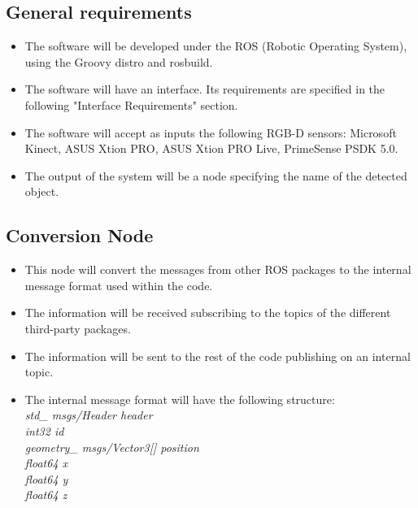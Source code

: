 \documentclass{article}
\begin{document}
\subsection{General requirements}
\begin{itemize}

\item The software will be developed under the ROS (Robotic Operating System), using the Groovy distro and rosbuild.
\item The software will have an interface. Its requirements are specified in the following "Interface Requirements" section. 
\item The software will accept as inputs the following RGB-D sensors: Microsoft Kinect, ASUS Xtion PRO, ASUS Xtion PRO Live, PrimeSense PSDK 5.0.
\item The output of the system will be a node specifying the name of the detected object. 
 
\end{itemize}
 
\subsection{Conversion Node}
\begin{itemize}
\item This node will convert the messages from other ROS packages to the internal message format used within the code. 
\item The information will be received subscribing to the topics of the different third-party packages. 
\item The information will be sent to the rest of the code publishing on an internal topic. 
\item The internal message format will have the following structure: \\[0.3cm]
\textit{
std\_ msgs/Header header\\[0.1cm]
int32 id\\[0.1cm]
geometry\_ msgs/Vector3[] position\\
\hspace*{0.5cm}float64 x\\
\hspace*{0.5cm}float64 y\\
\hspace*{0.5cm}float64 z\\
}
\end{itemize}
\end{document}
